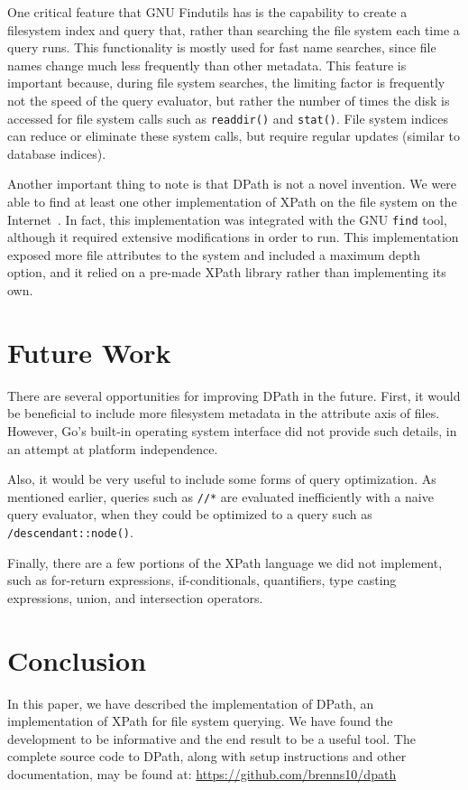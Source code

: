 \documentclass{scrartcl}
\begin{document}
One critical feature that GNU Findutils has is the capability to create a
filesystem index and query that, rather than searching the file system each time
a query runs. This functionality is mostly used for fast name searches, since
file names change much less frequently than other metadata. This feature is
important because, during file system searches, the limiting factor is
frequently not the speed of the query evaluator, but rather the number of times
the disk is accessed for file system calls such as \texttt{readdir()} and
\texttt{stat()}. File system indices can reduce or eliminate these system calls,
but require regular updates (similar to database indices).

Another important thing to note is that DPath is not a novel invention. We were
able to find at least one other implementation of XPath on the file system on
the Internet~\cite{other}. In fact, this implementation was integrated with the
GNU \texttt{find} tool, although it required extensive modifications in order to
run. This implementation exposed more file attributes to the system and included
a maximum depth option, and it relied on a pre-made XPath library rather than
implementing its own.

\section{Future Work}
\label{sec:future}

There are several opportunities for improving DPath in the future. First, it
would be beneficial to include more filesystem metadata in the attribute axis of
files. However, Go's built-in operating system interface did not provide such
details, in an attempt at platform independence.

Also, it would be very useful to include some forms of query optimization. As
mentioned earlier, queries such as \texttt{//*} are evaluated inefficiently with
a naive query evaluator, when they could be optimized to a query such as
\texttt{/descendant::node()}.

Finally, there are a few portions of the XPath language we did not implement,
such as for-return expressions, if-conditionals, quantifiers, type casting
expressions, union, and intersection operators.

\section{Conclusion}

In this paper, we have described the implementation of DPath, an implementation
of XPath for file system querying. We have found the development to be
informative and the end result to be a useful tool. The complete source code to
DPath, along with setup instructions and other documentation, may be found at:
\url{https://github.com/brenns10/dpath}



\end{document}
